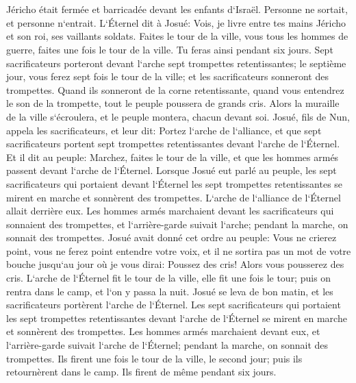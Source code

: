 \chapter{}

\verse Jéricho était fermée et barricadée devant les enfants d`Israël. Personne ne sortait, et personne n`entrait. 
\verse L`Éternel dit à Josué: Vois, je livre entre tes mains Jéricho et son roi, ses vaillants soldats. 
\verse Faites le tour de la ville, vous tous les hommes de guerre, faites une fois le tour de la ville. Tu feras ainsi pendant six jours. 
\verse Sept sacrificateurs porteront devant l`arche sept trompettes retentissantes; le septième jour, vous ferez sept fois le tour de la ville; et les sacrificateurs sonneront des trompettes. 
\verse Quand ils sonneront de la corne retentissante, quand vous entendrez le son de la trompette, tout le peuple poussera de grands cris. Alors la muraille de la ville s`écroulera, et le peuple montera, chacun devant soi. 
\verse Josué, fils de Nun, appela les sacrificateurs, et leur dit: Portez l`arche de l`alliance, et que sept sacrificateurs portent sept trompettes retentissantes devant l`arche de l`Éternel. 
\verse Et il dit au peuple: Marchez, faites le tour de la ville, et que les hommes armés passent devant l`arche de l`Éternel. 
\verse Lorsque Josué eut parlé au peuple, les sept sacrificateurs qui portaient devant l`Éternel les sept trompettes retentissantes se mirent en marche et sonnèrent des trompettes. L`arche de l`alliance de l`Éternel allait derrière eux. 
\verse Les hommes armés marchaient devant les sacrificateurs qui sonnaient des trompettes, et l`arrière-garde suivait l`arche; pendant la marche, on sonnait des trompettes. 
\verse Josué avait donné cet ordre au peuple: Vous ne crierez point, vous ne ferez point entendre votre voix, et il ne sortira pas un mot de votre bouche jusqu`au jour où je vous dirai: Poussez des cris! Alors vous pousserez des cris. 
\verse L`arche de l`Éternel fit le tour de la ville, elle fit une fois le tour; puis on rentra dans le camp, et l`on y passa la nuit. 
\verse Josué se leva de bon matin, et les sacrificateurs portèrent l`arche de l`Éternel. 
\verse Les sept sacrificateurs qui portaient les sept trompettes retentissantes devant l`arche de l`Éternel se mirent en marche et sonnèrent des trompettes. Les hommes armés marchaient devant eux, et l`arrière-garde suivait l`arche de l`Éternel; pendant la marche, on sonnait des trompettes. 
\verse Ils firent une fois le tour de la ville, le second jour; puis ils retournèrent dans le camp. Ils firent de même pendant six jours. 
